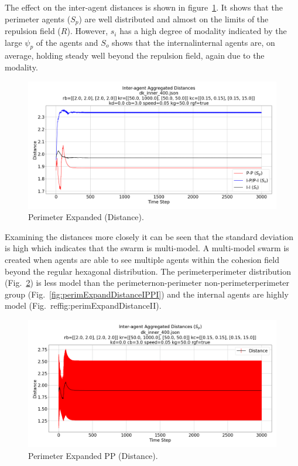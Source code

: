 \documentclass[12pt,a4paper]{IEEEtran}
\newcommand{\rb}{\mathit{R}}
\begin{document}
The effect on the inter-agent distances is shown in figure~\ref{fig:perimExpandDistance}. It shows that the perimeter agents ($S_p$) are well distributed and almost on the limits of the repulsion field ($\rb$). However, $s_i$ has a high degree of modality indicated by the large $\psi_p$ of the agents and $S_o$ shows that the internal\textrightarrow internal agents are, on average, holding steady well beyond the repulsion field, again due to the modality.

\begin{figure}[H]
	\begin{center}
		\includegraphics[width=1.0\linewidth]{figures/innerDistance}
	\end{center}
	\caption{Perimeter Expanded (Distance). \label{fig:perimExpandDistance}}
\end{figure}

Examining the distances more closely it can be seen that the standard deviation is high which indicates that the swarm is multi-model. A multi-model swarm is created when agents are able to see multiple agents within the cohesion field beyond the regular hexagonal distribution. The perimeter\textrightarrow perimeter distribution (Fig.~\ref{fig:perimExpandDistancePP}) is less model than the perimeter\textrightarrow non-perimeter non-perimeter\textrightarrow perimeter group (Fig.~\ref{fig:perimExpandDistanceIPPI}) and the internal agents are highly model (Fig.~ref{fig:perimExpandDistanceII}).

\begin{figure}[H]
	\begin{center}
		\includegraphics[width=1.0\linewidth]{figures/innerDistancePP}
	\end{center}
	\caption{Perimeter Expanded PP (Distance). \label{fig:perimExpandDistancePP}}
\end{figure}
\end{document}

